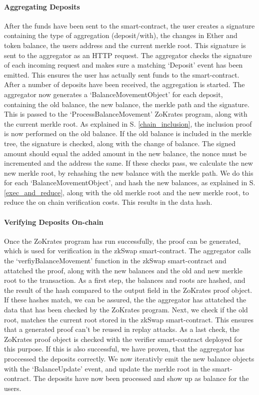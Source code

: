 \documentclass[../../thesis.tex]{subfiles}
\begin{document}
\paragraph{Aggregating Deposits}
After the funds have been sent to the smart-contract, the user creates a signature containing the type of aggregation (deposit/with), the changes in Ether and token balance, the users address and the current merkle root. This signature is sent to the aggregator as an HTTP request. The aggregator checks the signature of each incoming request and makes sure a matching `Deposit' event has been emitted. This ensures the user has actually sent funds to the smart-contract. After a number of deposits have been received, the aggregation is started. The aggregator now generates a `BalanceMovementObject' for each deposit, containing the old balance, the new balance, the merkle path and the signature. This is passed to the `ProcessBalanceMovement' ZoKrates program, along with the current merkle root. As explained in S. \ref{chain_inclusion}, the inclusion proof is now performed on the old balance. If the old balance is included in the merkle tree, the signature is checked, along with the change of balance. The signed amount should equal the added amount in the new balance, the nonce must be incremented and the address the same. If these checks pass, we calculate the new new merkle root, by rehashing the new balance with the merkle path. We do this for each `BalanceMovementObject', and hash the new balances, as explained in S. \ref{exec_and_reduce}, along with the old merkle root and the new merkle root, to reduce the on chain verification costs. This results in the data hash. 

\paragraph{Verifying Deposits On-chain}
Once the ZoKrates program has run successfully, the proof can be generated, which is used for verification in the zkSwap smart-contract. The aggregator calls the `verfiyBalanceMovement' function in the zkSwap smart-contract and attatched the proof, along with the new balances and the old and new merkle root to the transaction. As a first step, the balances and roots are hashed, and the result of the hash compared to the output field in the ZoKrates proof object. If these hashes match, we can be assured, the the aggregator has attatched the data that has been checked by the ZoKrates program. Next, we check if the old root, matches the current root stored in the zkSwap smart-contract. This ensures that a generated proof can't be reused in replay attacks. As a last check, the ZoKrates proof object is checked with the verifier smart-contract deployed for this purpose. If this is also successful, we have proven, that the aggregator has proccessed the deposits correctly. We now iterativly emit the new balance objects with the `BalanceUpdate' event, and update the merkle root in the smart-contract. The deposits have now been processed and show up as balance for the users. 
\end{document}
